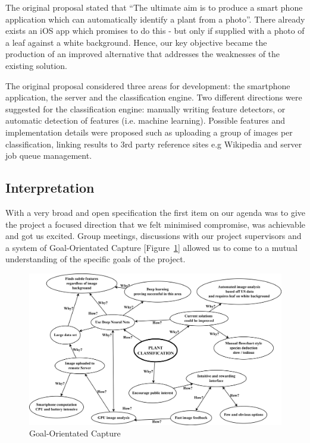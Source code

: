 \documentclass[a4paper,11pt]{article}
\begin{document}
The original proposal stated that ``The ultimate aim is to produce a smart phone application which can automatically identify a plant from a photo''. There already exists an iOS app which promises to do this \cite{leafsnap_scientificamerica} - but only if supplied with a photo of a leaf against a white background. Hence, our key objective became the production of an improved alternative that addresses the weaknesses of the existing solution.

The original proposal considered three areas for development: the smartphone application, the server and the classification engine. Two different directions were suggested for the classification engine: manually writing feature detectors, or automatic detection of features (i.e. machine learning). Possible features and implementation details were proposed such as uploading a group of images per classification, linking results to 3rd party reference sites e.g Wikipedia and server job queue management.

\subsection{Interpretation}

With a very broad and open specification the first item on our agenda was to give the project a focused direction that we felt minimised compromise, was achievable and got us excited. Group meetings, discussions with our project supervisors and a system of Goal-Orientated Capture [Figure~\ref{fig:goalorientedcapture}] allowed us to come to a mutual understanding of the specific goals of the project. 

\begin{figure}[h!]
  \centering
\includegraphics[width=165mm]{images/plantclassgoalcapture.png}
  \caption{Goal-Orientated Capture}
  \label{fig:goalorientedcapture}
\end{figure}
\end{document}

